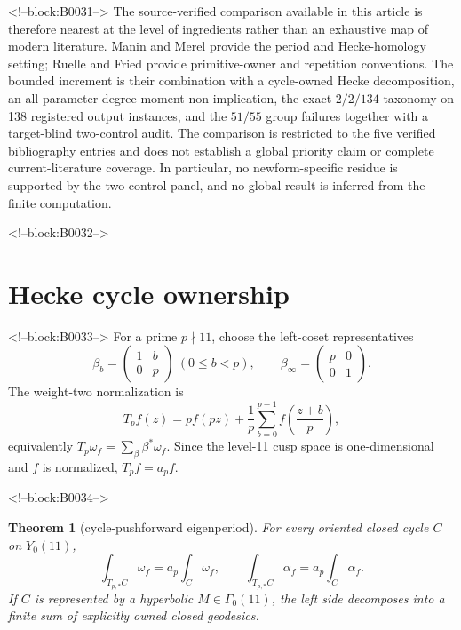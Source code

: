 \documentclass[11pt]{article}
\newtheorem{theorem}{Theorem}[section]
\theoremstyle{definition}
\theoremstyle{remark}
\newcommand{\G}{\Gamma_0(11)}
\begin{document}
<!--block:B0031-->
The source-verified comparison available in this article is therefore nearest at the level of ingredients rather than an exhaustive map of modern literature. Manin and Merel provide the period and Hecke-homology setting; Ruelle and Fried provide primitive-owner and repetition conventions. The bounded increment is their combination with a cycle-owned Hecke decomposition, an all-parameter degree-moment non-implication, the exact $2/2/134$ taxonomy on 138 registered output instances, and the $51/55$ group failures together with a target-blind two-control audit. The comparison is restricted to the five verified bibliography entries and does not establish a global priority claim or complete current-literature coverage. In particular, no newform-specific residue is supported by the two-control panel, and no global result is inferred from the finite computation.

<!--block:B0032-->
\section{Hecke cycle ownership}

<!--block:B0033-->
For a prime $p\nmid11$, choose the left-coset representatives
\[
\beta_b=\begin{pmatrix}1&b\\0&p\end{pmatrix}\ (0\leq b<p),
\qquad
\beta_\infty=\begin{pmatrix}p&0\\0&1\end{pmatrix}.
\]
The weight-two normalization is
\[
T_pf(z)=pf(pz)+\frac1p\sum_{b=0}^{p-1}f\!\left(\frac{z+b}{p}\right),
\]
equivalently $T_p\omega_f=\sum_\beta\beta^*\omega_f$. Since the level-11 cusp space is one-dimensional and $f$ is normalized, $T_pf=a_pf$.

<!--block:B0034-->
\begin{theorem}[cycle-pushforward eigenperiod]\label{thm:hecke}
For every oriented closed cycle $C$ on $Y_0(11)$,
\[
\int_{T_{p,*}C}\omega_f=a_p\int_C\omega_f,
\qquad
\int_{T_{p,*}C}\alpha_f=a_p\int_C\alpha_f.
\]
If $C$ is represented by a hyperbolic $M\in\G$, the left side decomposes into a finite sum of explicitly owned closed geodesics.
\end{theorem}
\end{document}

